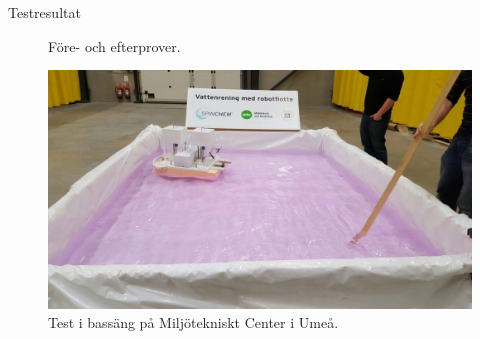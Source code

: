 \documentclass[final]{beamer}
\newlength{\onecolwid}
\begin{document}
\begin{frame}[t]
\begin{columns}[t, totalwidth=\textwidth]
\begin{column}{\onecolwid}
\begin{block}{Testresultat}
        \vskip 2cm
        \begin{figure}[H]
          \centering
          \caption{Före- och efterprover.}
        \end{figure}

        \vskip 2cm
        \begin{figure}[H]
          \centering
          \includegraphics[width=\linewidth]{figures/pool.jpeg}
          \caption{Test i bassäng på Miljötekniskt Center i Umeå.}
        \end{figure}
      \end{block}

    \end{column}

  \end{columns} %

\end{frame} %
\end{document}
